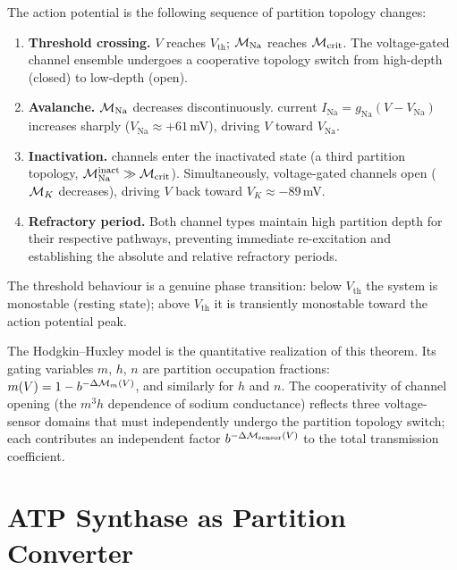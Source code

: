 \begin{theorem}
\label{thm:action_potential_transition}
The action potential is the following sequence of partition topology changes:
\begin{enumerate}[label=(\roman*)]
  \item \textbf{Threshold crossing.} $V$ reaches $V_{\mathrm{th}}$;
        $\mathcal{M}_{\mathrm{Na}}$ reaches $\mathcal{M}_{\mathrm{crit}}$. The
        voltage-gated  channel ensemble undergoes a cooperative
        topology switch from high-depth (closed) to low-depth (open).
  \item \textbf{Avalanche.} $\mathcal{M}_{\mathrm{Na}}$ decreases discontinuously.
         current $I_{\mathrm{Na}} = g_{\mathrm{Na}}(V - V_{\mathrm{Na}})$
        increases sharply ($V_{\mathrm{Na}} \approx +61$\,mV), driving $V$
        toward $V_{\mathrm{Na}}$.
  \item \textbf{Inactivation.}  channels enter the inactivated state
        (a third partition topology, $\mathcal{M}_{\mathrm{Na}}^{\mathrm{inact}} \gg \mathcal{M}_{\mathrm{crit}}$).
        Simultaneously, voltage-gated  channels open ($\mathcal{M}_K$ decreases),
        driving $V$ back toward $V_K \approx -89$\,mV.
  \item \textbf{Refractory period.} Both channel types maintain high partition
        depth for their respective pathways, preventing immediate re-excitation
        and establishing the absolute and relative refractory periods.
\end{enumerate}
The threshold behaviour is a genuine phase transition: below $V_{\mathrm{th}}$
the system is monostable (resting state); above $V_{\mathrm{th}}$ it is
transiently monostable toward the action potential peak.
\end{theorem}

The Hodgkin--Huxley model \citep{Hodgkin1952b} is the quantitative realization
of this theorem. Its gating variables $m$, $h$, $n$ are partition occupation
fractions: $m(V) = 1 - b^{-\Delta\mathcal{M}_m(V)}$, and similarly for $h$ and $n$.
The cooperativity of  channel opening (the $m^3 h$ dependence of sodium
conductance) reflects three voltage-sensor domains that must independently
undergo the partition topology switch; each contributes an independent factor
$b^{-\Delta\mathcal{M}_{\mathrm{sensor}}(V)}$ to the total transmission coefficient.

\section{ATP Synthase as Partition Converter}
\label{sec:atp_synthase}

